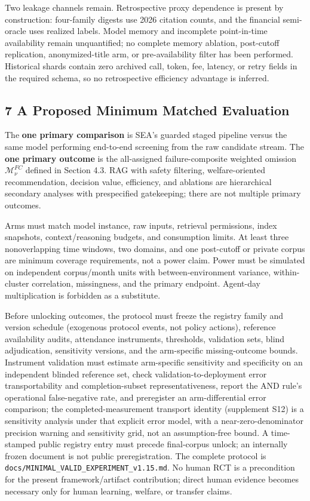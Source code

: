 \documentclass[
  11pt]{article}
\begin{document}
Two leakage channels remain. Retrospective proxy dependence is present
by construction: four-family digests use 2026 citation counts, and the
financial semi-oracle uses realized labels. Model memory and incomplete
point-in-time availability remain unquantified; no complete memory
ablation, post-cutoff replication, anonymized-title arm, or
pre-availability filter has been performed. Historical shards contain
zero archived call, token, fee, latency, or retry fields in the required
schema, so no retrospective efficiency advantage is inferred.

\subsection{7 A Proposed Minimum Matched
Evaluation}\label{a-proposed-minimum-matched-evaluation}

The \textbf{one primary comparison} is SEA's guarded staged pipeline
versus the same model performing end-to-end screening from the raw
candidate stream. The \textbf{one primary outcome} is the all-assigned
failure-composite weighted omission \(\mathcal M^{FC}_{\nu}\) defined in
Section 4.3. RAG with safety filtering, welfare-oriented recommendation,
decision value, efficiency, and ablations are hierarchical secondary
analyses with prespecified gatekeeping; there are not multiple primary
outcomes.

Arms must match model instance, raw inputs, retrieval permissions, index
snapshots, context/reasoning budgets, and consumption limits. At least
three nonoverlapping time windows, two domains, and one post-cutoff or
private corpus are minimum coverage requirements, not a power claim.
Power must be simulated on independent corpus/month units with
between-environment variance, within-cluster correlation, missingness,
and the primary endpoint. Agent-day multiplication is forbidden as a
substitute.

Before unlocking outcomes, the protocol must freeze the registry family
and version schedule (exogenous protocol events, not policy actions),
reference availability audits, attendance instruments, thresholds,
validation sets, blind adjudication, sensitivity versions, and the
arm-specific missing-outcome bounds. Instrument validation must estimate
arm-specific sensitivity and specificity on an independent blinded
reference set, check validation-to-deployment error transportability and
completion-subset representativeness, report the AND rule's operational
false-negative rate, and preregister an arm-differential error
comparison; the completed-measurement transport identity (supplement
S12) is a sensitivity analysis under that explicit error model, with a
near-zero-denominator precision warning and sensitivity grid, not an
assumption-free bound. A time-stamped public registry entry must precede
final-corpus unlock; an internally frozen document is not public
preregistration. The complete protocol is
\texttt{docs/MINIMAL\_VALID\_EXPERIMENT\_v1.15.md}. No human RCT is a
precondition for the present framework/artifact contribution; direct
human evidence becomes necessary only for human learning, welfare, or
transfer claims.
\end{document}
